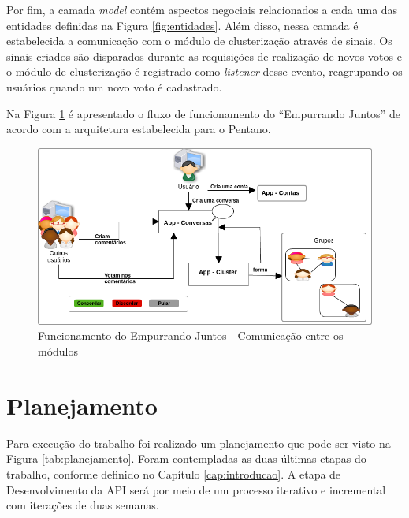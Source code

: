 Por fim, a camada \textit{model} contém aspectos negociais relacionados a cada uma das entidades definidas na 
Figura \ref{fig:entidades}. Além disso, nessa camada é estabelecida a comunicação com o módulo de clusterização através de sinais.
Os sinais criados são disparados durante as requisições de realização de novos votos e o módulo de clusterização é registrado
como \textit{listener} desse evento, reagrupando os usuários quando um novo voto é cadastrado.

Na Figura \ref{fig:resumo_ej_api} é apresentado o fluxo de funcionamento do ``Empurrando Juntos'' de acordo com a arquitetura
estabelecida para o Pentano.

\begin{figure}[bt!]
\centering
\includegraphics[scale=0.6]{figuras/resumo_ej_api.png}
\caption{Funcionamento do Empurrando Juntos - Comunicação entre os módulos}
\label{fig:resumo_ej_api}
\end{figure}

\vfill
\pagebreak

\section{Planejamento}

Para execução do trabalho foi realizado um planejamento que pode ser visto na Figura \ref{tab:planejamento}.
Foram contempladas as duas últimas etapas do trabalho, conforme definido no Capítulo \ref{cap:introducao}.
A etapa de Desenvolvimento da API será por meio de um processo iterativo e incremental com iterações de duas semanas. 

